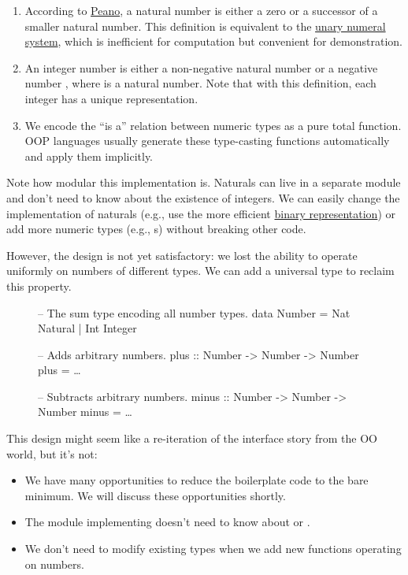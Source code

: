 \documentclass{article}
\begin{document}
\begin{enumerate}
  \item
    According to \href{https://en.wikipedia.org/wiki/Peano_axioms}{Peano}, a natural number is either a zero or a successor of a smaller natural number.
    This definition is equivalent to the \href{https://en.wikipedia.org/wiki/Unary_numeral_system}{unary numeral system}, which is inefficient for computation but convenient for demonstration.
  \item
    An integer number is either a non-negative natural number  or a negative number , where  is a natural number.
    Note that with this definition, each integer has a unique representation.
  \item
    We encode the ``is a'' relation between numeric types as a pure total function.
    OOP languages usually generate these type-casting functions automatically and apply them implicitly.
\end{enumerate}

Note how modular this implementation is.
Naturals can live in a separate module and don't need to know about the existence of integers.
We can easily change the implementation of naturals (e.g., use the more efficient \href{https://en.wikipedia.org/wiki/Binary_number}{binary representation}) or add more numeric types (e.g., s) without breaking other code.

However, the design is not yet satisfactory: we lost the ability to operate uniformly on numbers of different types.
We can add a universal  type to reclaim this property.

\begin{figure}
\begin{code}[haskell]
-- The sum type encoding all number types.
data Number = Nat Natural | Int Integer

-- Adds arbitrary numbers.
plus :: Number -> Number -> Number
plus = \ldots

-- Subtracts arbitrary numbers.
minus :: Number -> Number -> Number
minus = \ldots
\end{code}
\end{figure}

This design might seem like a re-iteration of the  interface story from the OO world, but it's not:

\begin{itemize}
  \item
    We have many opportunities to reduce the boilerplate code to the bare minimum.
    We will discuss these opportunities shortly.
  \item
    The module implementing  doesn't need to know about  or .
  \item
    We don't need to modify existing types when we add new functions operating on numbers.
\end{itemize}
\end{document}
